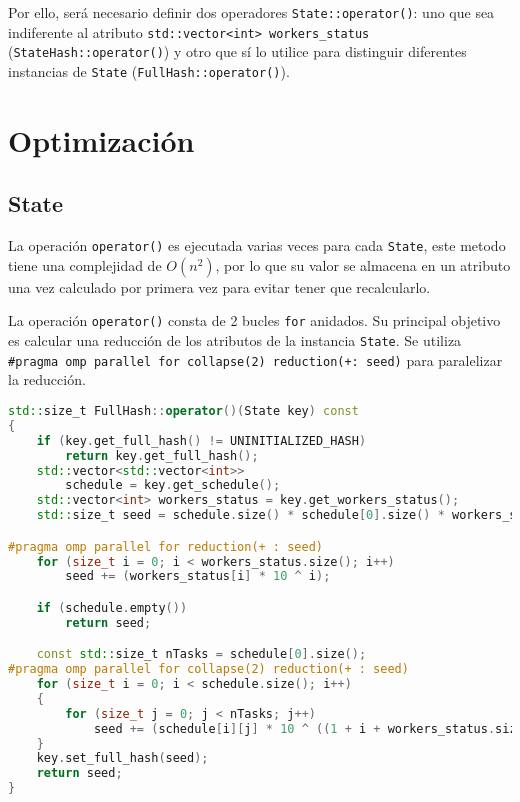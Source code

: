 Por ello, será necesario definir dos operadores \lstinline{State::operator()}:
uno que sea indiferente al atributo \lstinline{std::vector<int> workers_status}
(\lstinline{StateHash::operator()})
y otro que sí lo utilice para distinguir diferentes instancias de \lstinline{State}
(\lstinline{FullHash::operator()}).


\section{Optimización}

\subsection{State}

La operación \lstinline{operator()} es ejecutada varias veces para cada
\lstinline{State}, este metodo tiene una complejidad de $O(n^2)$,
por lo que su valor se almacena en un atributo una vez calculado por primera vez
para evitar tener que recalcularlo.

La operación \lstinline{operator()} consta de 2 bucles \lstinline{for} anidados.
Su principal objetivo es calcular una reducción de los atributos de la instancia
\lstinline{State}.
Se utiliza \lstinline{#pragma omp parallel for collapse(2) reduction(+: seed)}
para paralelizar la reducción.

\begin{lstlisting}[language=C++]
std::size_t FullHash::operator()(State key) const
{
    if (key.get_full_hash() != UNINITIALIZED_HASH)
        return key.get_full_hash();
    std::vector<std::vector<int>>
        schedule = key.get_schedule();
    std::vector<int> workers_status = key.get_workers_status();
    std::size_t seed = schedule.size() * schedule[0].size() * workers_status.size();

#pragma omp parallel for reduction(+ : seed)
    for (size_t i = 0; i < workers_status.size(); i++)
        seed += (workers_status[i] * 10 ^ i);

    if (schedule.empty())
        return seed;

    const std::size_t nTasks = schedule[0].size();
#pragma omp parallel for collapse(2) reduction(+ : seed)
    for (size_t i = 0; i < schedule.size(); i++)
    {
        for (size_t j = 0; j < nTasks; j++)
            seed += (schedule[i][j] * 10 ^ ((1 + i + workers_status.size()) * j + j));
    }
    key.set_full_hash(seed);
    return seed;
}
\end{lstlisting}

